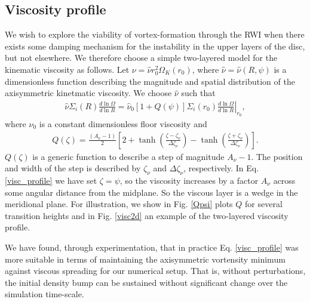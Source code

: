 \subsection{Viscosity profile}\label{visc_model}
We wish to explore the viability of vortex-formation through the RWI
when there exists some damping mechanism for the instability in the
upper layers of the disc, but not elsewhere. We therefore choose a
simple two-layered model for the kinematic viscosity as follows. Let
$\nu = \hat{\nu}r_0^2\Omega_K(r_0)$, where
$\hat{\nu}=\hat{\nu}(R,\psi)$ is a dimensionless function describing
the magnitude and spatial distribution of the axisymmetric kinetmatic
viscosity. We choose $\hat{\nu}$ such that   
\begin{align}\label{visc_profile}
  \hat{\nu}\Sigma_i(R)\frac{d\ln{\Omega}}{d\ln{R}} =
  \hat{\nu}_0\left[1+Q(\psi)\right]\Sigma_i(r_0)\left.\frac{d\ln{\Omega}}{d\ln{R}}\right|_{r_0}, 
\end{align}
where $\nu_0$ is a constant dimensionless floor viscosity and   
\begin{align}
  Q(\zeta) = \frac{\left(A_\nu - 1\right)}{2}
  \left[  2 + \tanh{\left(\frac{\zeta - \zeta_\nu}{\Delta\zeta_\nu}\right)}
  - \tanh{\left(\frac{\zeta +
        \zeta_\nu}{\Delta\zeta_\nu}\right)}\right]. 
\end{align}
$Q(\zeta)$ is a generic function to describe a step of magnitude
$A_\nu-1$. The position and width of the step is described by
$\zeta_\nu$ and $\Delta\zeta_\nu$, respectively. 
In Eq. \ref{visc_profile} we have set $\zeta=\psi$, 
so the viscosity increases by a factor $A_\nu$ across some angular
distance from the midplane. So the viscous layer is a wedge in the
meridional plane. For illustration, we show in Fig. \ref{Qpsi} plots $Q$ for several transition
heights and in  Fig. \ref{visc2d} an example of the two-layered
viscosity profile.

We have found, through experimentation, that in practice 
Eq. \ref{visc_profile} was more suitable in terms of maintaining the
axisymmetric vortensity minimum against viscous spreading for our
numerical setup. That is, without perturbations, the
initial density bump can be sustained without significant change 
over the simulation time-scale.  


